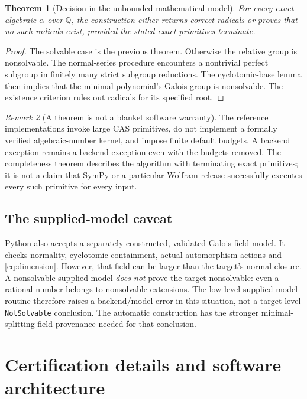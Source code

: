 \documentclass[11pt,letterpaper]{article}
\newcommand{\Q}{\mathbb Q}\newcommand{\C}{\mathbb C}
\newcommand{\code}[1]{\texttt{#1}}
\newtheorem{theorem}{Theorem}[section]
\theoremstyle{definition}\newtheorem{definition}[theorem]{Definition}
\theoremstyle{remark}\newtheorem{remark}[theorem]{Remark}
\begin{document}
\begin{theorem}[Decision in the unbounded mathematical model]
For every exact algebraic \(\alpha\) over \(\Q\), the construction either
returns correct radicals or proves that no such radicals exist, provided
the stated exact primitives terminate.
\end{theorem}
\begin{proof}
The solvable case is the previous theorem. Otherwise the relative group is
nonsolvable. The normal-series procedure encounters a nontrivial perfect
subgroup in finitely many strict subgroup reductions. The cyclotomic-base
lemma then implies that the minimal polynomial's Galois group is nonsolvable.
The existence criterion rules out radicals for its specified root.
\end{proof}

\begin{remark}[A theorem is not a blanket software warranty]
The reference implementations invoke large CAS primitives, do not implement
a formally verified algebraic-number kernel, and impose finite default
budgets. A backend exception remains a backend exception even with the
budgets removed. The completeness theorem describes the algorithm with
terminating exact primitives; it is not a claim that SymPy or a particular
Wolfram release successfully executes every such primitive for every input.
\end{remark}

\subsection{The supplied-model caveat}

Python also accepts a separately constructed, validated Galois field model.
It checks normality, cyclotomic containment, actual automorphism actions and
\eqref{eq:dimension}. However, that field can be larger than the target's
normal closure. A nonsolvable supplied model \emph{does not} prove the target
nonsolvable: even a rational number belongs to nonsolvable extensions.
The low-level supplied-model routine therefore raises a backend/model error
in this situation, not a target-level \code{NotSolvable} conclusion. The
automatic construction has the stronger minimal-splitting-field provenance
needed for that conclusion.

\section{Certification details and software architecture}
\end{document}
